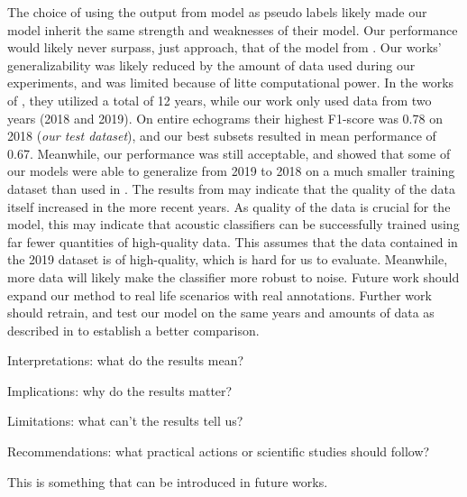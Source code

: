     The choice of using the output from \citeauthor{brautaset2020acoustic} model as pseudo labels likely made our model inherit the same strength and weaknesses of their model. Our performance would likely never surpass, just approach, that of the model from \citeauthor{brautaset2020acoustic}. Our works' generalizability was likely reduced by the amount of data used during our experiments, and was limited because of litte computational power. In the works of \citeauthor{brautaset2020acoustic}, they utilized a total of 12 years, while our work only used data from two years (2018 and 2019). On entire echograms their highest F1-score was 0.78 on 2018 (\textit{our test dataset}), and our best subsets resulted in mean performance of 0.67. Meanwhile, our performance was still acceptable, and showed that some of our models were able to generalize from 2019 to 2018 on a much smaller training dataset than used in \citeauthor{brautaset2020acoustic}. The results from \citeauthor{brautaset2020acoustic} may indicate that the quality of the data itself increased in the more recent years. As quality of the data is crucial for the model, this may indicate that acoustic classifiers can be successfully trained using far fewer quantities of high-quality data. This assumes that the data contained in the 2019 dataset is of high-quality, which is hard for us to evaluate. Meanwhile, more data will likely make the classifier more robust to noise. Future work should expand our method to real life scenarios with real annotations. Further work should retrain, and test our model on the same years and amounts of data as described in \citeauthor{brautaset2020acoustic} to establish a better comparison. 

    
    Interpretations: what do the results mean?
    
    Implications: why do the results matter?
    
    Limitations: what can’t the results tell us?
    
    Recommendations: what practical actions or scientific studies should follow?
    

     
     This is something that can be introduced in future works.

